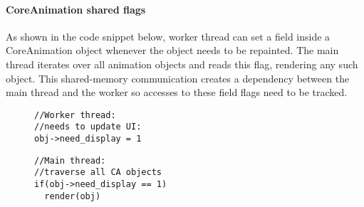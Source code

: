 \paragraph{CoreAnimation shared flags}
As shown in the code snippet below, worker thread can set
a field  inside a CoreAnimation
object whenever the object needs to be repainted. The main thread iterates over
all animation objects and reads this flag, rendering any such object. This
shared-memory communication creates a dependency between the main thread and the
worker so accesses to these field flags need to be tracked.
\vspace{-4mm}
\begin{figure}[ht!]
\begin{minipage}[t]{.20\textwidth}
\begin{lstlisting}
//Worker thread:
//needs to update UI:
obj->need_display = 1
\end{lstlisting}\hfill
\end{minipage}
\noindent\begin{minipage}[t]{.28\textwidth}
\begin{lstlisting}
//Main thread: 
//traverse all CA objects
if(obj->need_display == 1)
  render(obj)
\end{lstlisting}\hfill
\end{minipage}
    \label{fig:casharedflag}
\end{figure}
\vspace{-10mm}

